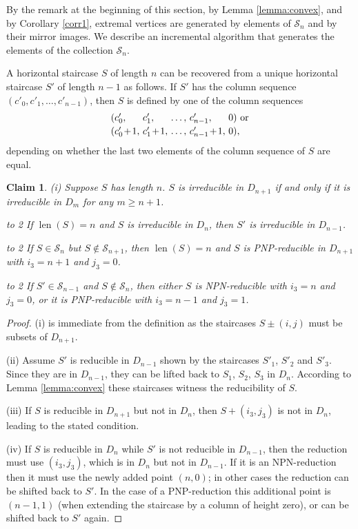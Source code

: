 \documentclass[reqno]{amsart}
\newtheorem{claim}[theorem]{Claim}
\theoremstyle{definition}
\newcommand\tsp{\mkern 1.5mu}
\renewcommand\ge{\geqslant}\renewcommand\le{\leqslant}
\DeclareMathOperator\len{\mathrm{len}}
\def\m#1{\tsp{#1}\tsp}
\def\titem#1{\noindent\hbox to 2\parindent{\hss\upshape
#1}\space\ignorespaces\advance\leftmargin2\parindent}
\begin{document}
By the remark at the beginning of this section, by Lemma \ref{lemma:convex},
and by Corollary \ref{corr1}, extremal vertices are generated by elements of
$\mathcal S_n$ and by their mirror images. We describe an incremental
algorithm that generates the elements of the collection $\mathcal S_n$.

A horizontal staircase $S$ of length $n$ can be recovered from a unique
horizontal staircase $S'$ of length $n-1$ as follows. If $S'$ has the column
sequence $(c'_0,c'_1,\dots,c'_{n-1})$, then $S$ is defined by one of the
column sequences
$$\begin{array}{l@{~}l@{~}l@{~}l@{~}l}
  (c'_0, & c'_1, & \dots, & c'_{n-1}, & 0) \mbox{ or}\\[2pt]
  (c'_0\m+1, & c'_1\m+1, & \dots, & c'_{n-1}\m+1, &0),
\end{array}$$
depending on whether the last two elements of the column sequence of $S$ are
equal.

\begin{claim}\label{claim:cases}{\upshape(i)} \parindent{}
Suppose $S$ has length $n$. $S$ is irreducible in $D_{n+1}$ if and only if
it is irreducible in $D_m$ for any $m\ge n+1$.\par

\titem{(ii)} If $\len(S)=n$ and $S$ is irreducible in $D_n$, then $S'$ is
irreducible in $D_{n-1}$.

\titem{(iii)} If $S\in\mathcal S_n$ but $S\notin\mathcal S_{n+1}$, then
$\len(S)=n$ and $S$ is PNP-reducible in $D_{n+1}$ with $i_3=n+1$ and
$j_3=0$.

\titem{(iv)} If $S'\in\mathcal S_{n-1}$ and $S\notin\mathcal S_n$, then
either $S$ is NPN-reducible with $i_3=n$ and $j_3=0$, or it is
PNP-reducible with $i_3=n-1$ and $j_3=1$.
\end{claim}
\begin{proof}
(i) is immediate from the definition as the staircases $S\pm(i,j)$ must be
subsets of $D_{n+1}$. 

\smallskip
\noindent(ii)
Assume $S'$ is reducible in $D_{n-1}$ shown by
the staircases $S'_1$, $S'_2$ and $S'_3$. Since they are in $D_{n-1}$, they
can be lifted back to $S_1$, $S_2$, $S_3$ in $D_n$. According to Lemma
\ref{lemma:convex} these staircases witness the reducibility of $S$.

\smallskip
\noindent (iii)
If $S$ is reducible in $D_{n+1}$ but not in $D_n$, then $S+(i_3,j_3)$ is not
in $D_n$, leading to the stated condition.

\smallskip
\noindent (iv)
If $S$ is reducible in $D_n$ while $S'$ is not reducible in $D_{n-1}$, then
the reduction must use $(i_3,j_3)$, which is in $D_n$ but not in $D_{n-1}$.
If it is an NPN-reduction then it must use the newly added point $(n,0)$; in
other cases the reduction can be shifted back to $S'$. In the case of a
PNP-reduction this additional point is $(n-1,1)$ (when extending the
staircase by a column of height zero), or can be shifted back to $S'$ again.
\end{proof}
\end{document}
